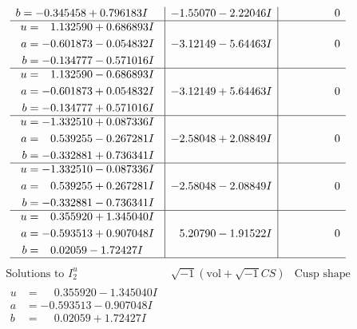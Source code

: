 \documentclass[1p]{elsarticle_modified}
\theoremstyle{definition}
\newcommand{\I}{\sqrt{-1}}
\begin{document}
$$\begin{array}{c|c|c}
\begin{aligned}
b &= -0.345458 + 0.796183 I\end{aligned}
 & -1.55070 - 2.22046 I & \phantom{-0.000000 } 0 \\ \hline\begin{aligned}
u &= \phantom{-}1.132590 + 0.686893 I \\
a &= -0.601873 - 0.054832 I \\
b &= -0.134777 - 0.571016 I\end{aligned}
 & -3.12149 - 5.64463 I & \phantom{-0.000000 } 0 \\ \hline\begin{aligned}
u &= \phantom{-}1.132590 - 0.686893 I \\
a &= -0.601873 + 0.054832 I \\
b &= -0.134777 + 0.571016 I\end{aligned}
 & -3.12149 + 5.64463 I & \phantom{-0.000000 } 0 \\ \hline\begin{aligned}
u &= -1.332510 + 0.087336 I \\
a &= \phantom{-}0.539255 - 0.267281 I \\
b &= -0.332881 + 0.736341 I\end{aligned}
 & -2.58048 + 2.08849 I & \phantom{-0.000000 } 0 \\ \hline\begin{aligned}
u &= -1.332510 - 0.087336 I \\
a &= \phantom{-}0.539255 + 0.267281 I \\
b &= -0.332881 - 0.736341 I\end{aligned}
 & -2.58048 - 2.08849 I & \phantom{-0.000000 } 0 \\ \hline\begin{aligned}
u &= \phantom{-}0.355920 + 1.345040 I \\
a &= -0.593513 + 0.907048 I \\
b &= \phantom{-}0.02059 - 1.72427 I\end{aligned}
 & \phantom{-}5.20790 - 1.91522 I & \phantom{-0.000000 } 0\\
 \hline 
 \end{array}$$\newpage$$\begin{array}{c|c|c}  
\text{Solutions to }I^u_{2}& \I (\text{vol} + \sqrt{-1}CS) & \text{Cusp shape}\\
 \hline 
\begin{aligned}
u &= \phantom{-}0.355920 - 1.345040 I \\
a &= -0.593513 - 0.907048 I \\
b &= \phantom{-}0.02059 + 1.72427 I\end{aligned}

\end{array}$$
\end{document}
